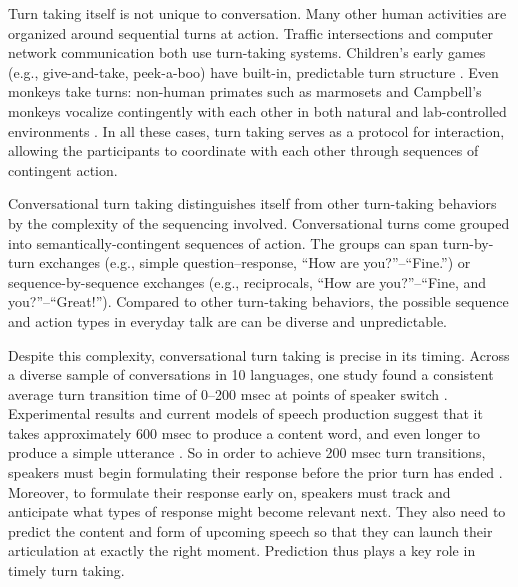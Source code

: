 \documentclass[authoryear, 12pt]{elsarticle}
\begin{document}
Turn taking itself is not unique to conversation. Many other human activities are organized around sequential turns at action. Traffic intersections and computer network communication both use turn-taking systems. Children's early games (e.g., give-and-take, peek-a-boo) have built-in, predictable turn structure \citep{ratner1978, ross1987}. Even monkeys take turns: non-human primates such as marmosets and Campbell's monkeys vocalize contingently with each other in both natural and lab-controlled environments \citep{lemasson2011, takahashi2013}. In all these cases, turn taking serves as a protocol for interaction, allowing the participants to coordinate with each other through sequences of contingent action. 

Conversational turn taking distinguishes itself from other turn-taking behaviors by the complexity of the sequencing involved. Conversational turns come grouped into semantically-contingent sequences of action. The groups can span turn-by-turn exchanges (e.g., simple question--response, ``How are you?''--``Fine.'') or sequence-by-sequence exchanges (e.g., reciprocals, ``How are you?''--``Fine, and you?''--``Great!''). Compared to other turn-taking behaviors, the possible sequence and action types in everyday talk are can be diverse and unpredictable. 


Despite this complexity, conversational turn taking is precise in its timing. Across a diverse sample of conversations in 10 languages, one study found a consistent average turn transition time of 0--200 msec at points of speaker switch \citep{stivers2009}. Experimental results and current models of speech production suggest that it takes approximately 600 msec to produce a content word, and even longer to produce a simple utterance \citep{griffin2000, levelt1989}. So in order to achieve 200 msec turn transitions, speakers must begin formulating their response before the prior turn has ended \citep{levinson2013, levinson2016}. Moreover, to formulate their response early on, speakers must track and anticipate what types of response might become relevant next. They also need to predict the content and form of upcoming speech so that they can launch their articulation at exactly the right moment. Prediction thus plays a key role in timely turn taking.
\end{document}
